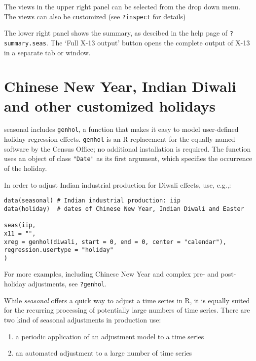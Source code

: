 The views in the upper right panel can be selected from the drop down
menu. The views can also be customized (see \texttt{?inspect} for
details)

The lower right panel shows the summary, as descibed in the help page of
\texttt{?summary.seas}. The `Full X-13 output' button opens the complete
output of X-13 in a separate tab or window.

\section{Chinese New Year, Indian Diwali and other customized
holidays}\label{chinese-new-year-indian-diwali-and-other-customized-holidays}

seasonal includes \texttt{genhol}, a function that makes it easy to
model user-defined holiday regression effects. \texttt{genhol} is an R
replacement for the equally named software by the Census Office; no
additional installation is required. The function uses an object of
class \texttt{"Date"} as its first argument, which specifies the
occurrence of the holiday.

In order to adjust Indian industrial production for Diwali effects, use,
e.g.,:

\begin{verbatim}
data(seasonal) # Indian industrial production: iip
data(holiday)  # dates of Chinese New Year, Indian Diwali and Easter

seas(iip, 
x11 = "",
xreg = genhol(diwali, start = 0, end = 0, center = "calendar"), 
regression.usertype = "holiday"
)
\end{verbatim}

For more examples, including Chinese New Year and complex pre- and
post-holiday adjustments, see \texttt{?genhol}.


While \emph{seasonal} offers a quick way to adjust a time series in R,
it is equally suited for the recurring processing of potentially large
numbers of time series. There are two kind of seasonal adjustments in
production use:

\begin{enumerate}
\def\labelenumi{\arabic{enumi}.}
\itemsep1pt\parskip0pt
\item
  a periodic application of an adjustment model to a time series
\item
  an automated adjustment to a large number of time series
\end{enumerate}

